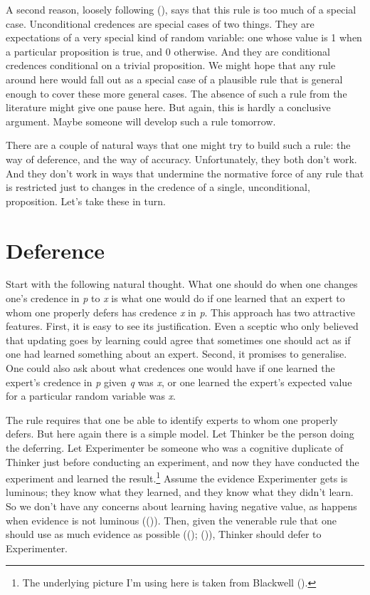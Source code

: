 \documentclass[
  11pt,
  letterpaper,
  DIV=11,
  numbers=noendperiod,
  twoside]{scrartcl}
\begin{document}
A second reason, loosely following
(), says that
this rule is too much of a special case. Unconditional credences are
special cases of two things. They are expectations of a very special
kind of random variable: one whose value is 1 when a particular
proposition is true, and 0 otherwise. And they are conditional credences
conditional on a trivial proposition. We might hope that any rule around
here would fall out as a special case of a plausible rule that is
general enough to cover these more general cases. The absence of such a
rule from the literature might give one pause here. But again, this is
hardly a conclusive argument. Maybe someone will develop such a rule
tomorrow.

There are a couple of natural ways that one might try to build such a
rule: the way of deference, and the way of accuracy. Unfortunately, they
both don't work. And they don't work in ways that undermine the
normative force of any rule that is restricted just to changes in the
credence of a single, unconditional, proposition. Let's take these in
turn.

\section{Deference}\label{sec-defer}

Start with the following natural thought. What one should do when one
changes one's credence in \emph{p} to \emph{x} is what one would do if
one learned that an expert to whom one properly defers has credence
\emph{x} in \emph{p}. This approach has two attractive features. First,
it is easy to see its justification. Even a sceptic who only believed
that updating goes by learning could agree that sometimes one should act
as if one had learned something about an expert. Second, it promises to
generalise. One could also ask about what credences one would have if
one learned the expert's credence in \emph{p} given \emph{q} was
\emph{x}, or one learned the expert's expected value for a particular
random variable was \emph{x}.

The rule requires that one be able to identify experts to whom one
properly defers. But here again there is a simple model. Let Thinker be
the person doing the deferring. Let Experimenter be someone who was a
cognitive duplicate of Thinker just before conducting an experiment, and
now they have conducted the experiment and learned the
result.\footnote{The underlying picture I'm using here is taken from
  Blackwell ().} Assume the evidence
Experimenter gets is luminous; they know what they learned, and they
know what they didn't learn. So we don't have any concerns about
learning having negative value, as happens when evidence is not luminous
(()). Then, given the venerable
rule that one should use as much evidence as possible
(();
()), Thinker should defer
to Experimenter.
\end{document}
